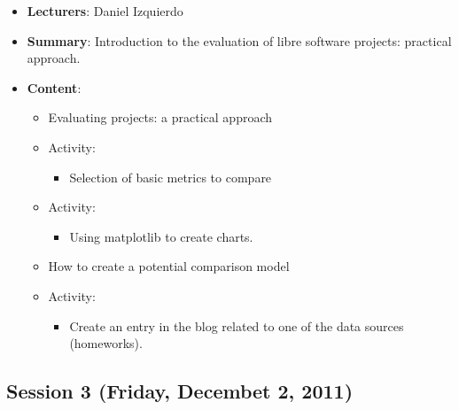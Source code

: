 \documentclass[a4paper]{article}
\begin{document}
\begin{itemize}
 \item \textbf{Lecturers}: Daniel Izquierdo
 \item \textbf{Summary}: Introduction to the evaluation of libre software projects: practical approach.
 \item \textbf{Content}:

    \begin{itemize}
      \item Evaluating projects: a practical approach
      \item Activity:
        \begin{itemize}
          \item Selection of basic metrics to compare
        \end{itemize}
      \item Activity:
        \begin{itemize}
          \item Using matplotlib to create charts.
        \end{itemize}
      \item How to create a potential comparison model
      \item Activity:
         \begin{itemize}
           \item Create an entry in the blog related to one of the data sources (homeworks).
         \end{itemize}
    \end{itemize}


\end{itemize}





\subsection{Session 3 (Friday, Decembet 2, 2011)}
\end{document}
